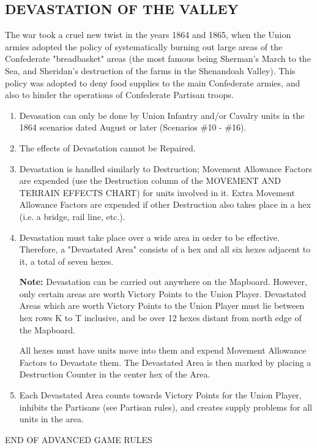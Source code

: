 \subsection{DEVASTATION OF THE VALLEY}

The war took a cruel new twist in the years 1864 and 1865, when the Union
armies adopted the policy of systematically burning out large areas of the
Confederate "breadbasket" areas (the most famous being Sherman's March to the
Sea, and Sheridan's destruction of the farms in the Shenandoah Valley). This
policy was adopted to deny food supplies to the main Confederate armies, and
also to hinder the operations of Confederate Partisan troops.

\begin{enumerate}
  \item Devasation can only be done by Union Infantry and/or Cavalry units in
        the 1864 scenarios dated August or later (Scenarios \#10 - \#16).
  \item The effects of Devastation cannot be Repaired.
  \item Devastation is handled similarly to Destruction; Movement Allowance
        Factors are expended (use the Destruction column of the MOVEMENT
        AND TERRAIN EFFECTS CHART) for units involved in it. Extra Movement
        Allowance Factors are expended if other Destruction also takes place
        in a hex (i.e. a bridge, rail line, etc.).
  \item Devastation must take place over a wide area in order to be effective.
        Therefore, a "Devastated Area" consists of a hex and all six hexes
        adjacent to it, a total of seven hexes.

        \textbf{Note:} Devastation can be carried out anywhere on the Mapboard.
        However, only certain areas are worth Victory Points to the Union Player.
        Devastated Areas which are worth Victory Points to the Union Player must
        lie between hex rows K to T inclusive, and be over 12 hexes distant from
        north edge of the Mapboard.

        All hexes must have units move into them and expend Movement Allowance
        Factors to Devastate them. The Devastated Area is then marked by placing
        a Destruction Counter in the center hex of the Area.

  \item Each Devastated Area counts towards Victory Points for the Union Player,
        inhibits the Partisans (see Partisan rules), and creates supply problems
        for all units in the area.
\end{enumerate}

END OF ADVANCED GAME RULES